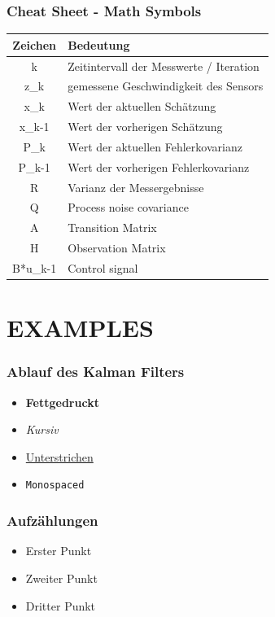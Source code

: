 \documentclass{beamer}
\begin{document}
\begin{frame}
    \frametitle{Cheat Sheet - Math Symbols}
    \begin{table}[h]
        \centering
        \begin{tabular}{|c|p{8cm}|}
        \hline
        \textbf{Zeichen} & \textbf{Bedeutung} \\ \hline
        k          & Zeitintervall der Messwerte / Iteration \\ \hline
        z\_k       & gemessene Geschwindigkeit des Sensors \\ \hline
        x\_k       & Wert der aktuellen Schätzung \\ \hline
        x\_{k-1}   & Wert der vorherigen Schätzung \\ \hline
        P\_k       & Wert der aktuellen Fehlerkovarianz \\ \hline
        P\_{k-1}   & Wert der vorherigen Fehlerkovarianz \\ \hline
        R          & Varianz der Messergebnisse \\ \hline
        Q          & Process noise covariance \\ \hline
        A          & Transition Matrix \\ \hline
        H          & Observation Matrix \\ \hline
        B*u\_{k-1} & Control signal \\ \hline
        \end{tabular}
        \end{table}
\end{frame}

\section{EXAMPLES}

\begin{frame}
    \frametitle{Ablauf des Kalman Filters}
    \begin{itemize}
        \item \textbf{Fettgedruckt}
        \item \textit{Kursiv}
        \item \underline{Unterstrichen}
        \item \texttt{Monospaced}
    \end{itemize}
\end{frame}

\begin{frame}
    \frametitle{Aufzählungen}
    \begin{itemize}
        \item Erster Punkt
        \item Zweiter Punkt
        \item Dritter Punkt
    \end{itemize}
\end{frame}
\end{document}
